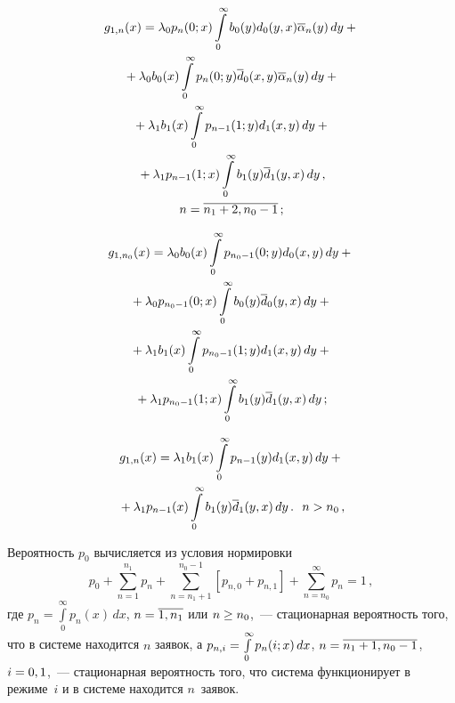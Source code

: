\begin{multicols}{2}
\vspace*{-12pt}

\noindent
\begin{multline*}
g_{1,n}(x) = \lambda_0 p_{n}(0;x) \int\limits_0^\infty b_0(y) d_0(y,x) \overline\alpha_n(y)\, dy
+{}\\
{}+ \lambda_0 b_0(x) \int\limits_0^\infty p_{n}(0;y) \overline d_0(x,y) \overline\alpha_n(y)\, dy
+ {}\\
{}+ \lambda_1 b_1(x) \int\limits_0^\infty p_{n-1}(1;y) d_1(x,y)\, dy+{}\\
{}+
\lambda_1 p_{n-1}(1;x) \int\limits_0^\infty b_1(y) \overline d_1(y,x)\, dy\,,
\\ n=\overline{n_1+2,n_0-1}\,;
\end{multline*}

\vspace*{-24pt}

\noindent
\begin{multline*}
g_{1,n_0}(x) = \lambda_0 b_0(x)\int\limits_0^\infty p_{n_0-1}(0;y) d_0(x,y)\, dy
+{}\\
{}+
\lambda_0 p_{n_0-1}(0;x) \int\limits_0^\infty b_0(y) \overline d_0(y,x)\, dy+{}
\\
{}+ \lambda_1 b_1(x) \int\limits_0^\infty p_{n_0-1}(1;y) d_1(x,y)\, dy+{}\\
{}+
\lambda_1 p_{n_0-1}(1;x) \int\limits_0^\infty b_1(y) \overline d_1(y,x)\, dy \,;
\end{multline*}

\vspace*{-12pt}

\noindent
\begin{multline}
\label{3-gf-3-m}
g_{1,n}(x)= \lambda_1 b_1(x) \int\limits_0^\infty p_{n-1}(y) d_1(x,y)\, dy
+{}\\
{}+ \lambda_1 p_{n-1}(x) \int\limits_0^\infty b_1(y) \overline d_1(y,x)\, dy\,.
\ \ n>n_0\,,
\end{multline}

Вероятность $p_0$ вычисляется из условия нормировки
$$
p_0 + \sum\limits_{n=1}^{n_1} p_n+\sum\limits_{n=n_1+1}^{n_0-1} \left[p_{n,0} + p_{n,1}\right]
+
\sum\limits_{n=n_0}^{\infty} p_n = 1\,,
$$
где $p_n = \int\limits_0^\infty p_n(x)\, dx$,
$n\hm=\overline{1,n_1}$ или $n\hm\ge n_0$,~---
стационарная вероятность того, что в системе находится
$n$ заявок, а $p_{n,i} \hm= \int\limits_0^\infty p_n(i;x)\, dx$,
$n\hm=\overline{n_1+1,n_0-1}$, $i\hm=0,1$,~--- стационарная
вероятность того, что система функционирует в режиме~$i$ и
в системе находится $n$~заявок.


\end{multicols}
